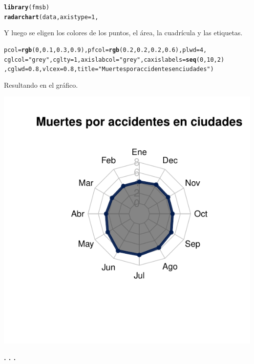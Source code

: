 \documentclass{article}\usepackage[]{graphicx}\usepackage[]{color}
\makeatletter
\def\maxwidth{ %
  \ifdim\Gin@nat@width>\linewidth
    \linewidth
  \else
    \Gin@nat@width
  \fi
}
\newcommand{\hlstr}[1]{\textcolor[rgb]{0.192,0.494,0.8}{#1}}%
\newcommand{\hlkwd}[1]{\textcolor[rgb]{0.737,0.353,0.396}{\textbf{#1}}}%
\newenvironment{kframe}{%
 \def\at@end@of@kframe{}%
 \ifinner\ifhmode%
  \def\at@end@of@kframe{\end{minipage}}%
  \begin{minipage}{\columnwidth}%
 \fi\fi%
 \def\FrameCommand##1{\hskip\@totalleftmargin \hskip-\fboxsep
 \colorbox{shadecolor}{##1}\hskip-\fboxsep
     \hskip-\linewidth \hskip-\@totalleftmargin \hskip\columnwidth}%
 \MakeFramed {\advance\hsize-\width
   \@totalleftmargin\z@ \linewidth\hsize
   \@setminipage}}%
 {\par\unskip\endMakeFramed%
 \at@end@of@kframe}
\newenvironment{knitrout}{}{} %
\makeatother
\begin{document}
\begin{knitrout}
\color{fgcolor}\begin{kframe}
\begin{alltt}
\hlkwd{library}(fmsb)
\hlkwd{radarchart}( data  , axistype=1 ,
\end{alltt}
\end{kframe}
\end{knitrout}
Y luego se eligen los colores de los puntos, el \'area, la cuadr\'icula y las etiquetas.
\begin{knitrout}
\color{fgcolor}\begin{kframe}
\begin{alltt}
            pcol=\hlkwd{rgb}(0,0.1,0.3,0.9) , pfcol=\hlkwd{rgb}(0.2,0.2,0.2,0.6) , plwd=4 ,
            cglcol=\hlstr{"grey"}, cglty=1, axislabcol=\hlstr{"grey"}, caxislabels=\hlkwd{seq}(0,10,2)
            , cglwd=0.8, vlcex=0.8, title = \hlstr{"Muertes por accidentes en ciudades"} )
\end{alltt}
\end{kframe}
\end{knitrout}
\clearpage
Resultando en el gr\'afico.
\begin{knitrout}
\color{fgcolor}

{\centering \includegraphics[width=\maxwidth]{figure/plot_fmsb-1} 

}



\end{knitrout}
\begin{center}
\textbf{. . .}
\end{center}
\end{document}
